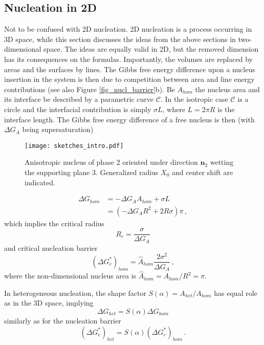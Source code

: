     \subsection{Nucleation in 2D}
    Not to be confused with 2D nucleation. 2D nucleation is a process occurring in 3D space, while this section discusses the ideas from the above sections in two-dimensional space. The ideas are equally valid in 2D, but the removed dimension has its consequences on the formulas. Importantly, the volumes are replaced by areas and the surfaces by lines. The Gibbs free energy difference upon a nucleus insertion in the system is then due to competition between area and line energy contributions (see also Figure \ref{fig_nucl_barrier}b). Be $A_{hom}$ the nucleus area and its interface be described by a parametric curve $\mathcal{C}$. In the isotropic case $\mathcal{C}$ is a circle and the interfacial contribution is simply $\sigma L$, where $L=2\pi R$ is the interface length. The Gibbs free energy difference of a free nucleus is then (with $\Delta G_A$ being supersaturation)
    \begin{figure}
    	\centering
    	\texttt{[image: sketches\_intro.pdf]}
    	\caption[Sketch - heterogeneous nucleus with anisotropic interface energy]{Anisotropic nucleus of phase $\mathit{2}$ oriented under direction $\bm{n}_\mathit{2}$ wetting the supporting plane $\mathit{3}$. Generalized radius $X_0$ and center shift are indicated.}
    	\label{fig_}
    \end{figure}
    \begin{align}
        \Delta G_{hom} &= -\Delta G_A A_{hom} + \sigma L \\
            &= (-\Delta G_A R^2 + 2R\sigma)\pi \,,
    \end{align}
    which implies the critical radius
    \begin{equation} \label{eq_crit_radius_2D}
        R_c = \frac{\sigma}{\Delta G_A}
    \end{equation}
    and critical nucleation barrier
    \begin{equation} 
        (\Delta G_c^*)_{hom} = \hat{A}_{hom}\frac{2\sigma^2}{\Delta G_A}\,,
    \end{equation}
    where the non-dimensional nucleus area is $\hat{A}_{hom}=A_{hom}/R^2=\pi$.
    
    In heterogeneous nucleation, the shape factor $S(\alpha)=A_{het}/A_{hom}$ has equal role as in the 3D space, implying
    \begin{equation}\label{eq_DG_het_2D}
        \Delta G_{het} = S(\alpha)\Delta G_{hom}
    \end{equation}
    similarly as for the nucleation barrier
    \begin{equation}\label{eq_nucl_barr_het_2D}
        (\Delta G_c^*)_{het} = S(\alpha)(\Delta G_c^*)_{hom}\,.
    \end{equation}
    

